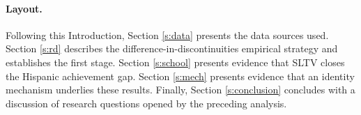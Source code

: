 \documentclass[11pt]{article}
\begin{document}








\paragraph{Layout.} Following this Introduction, Section \ref{s:data} presents the data sources used. Section \ref{s:rd} describes the difference-in-discontinuities empirical strategy and establishes the first stage. Section \ref{s:school} presents evidence that SLTV closes the Hispanic achievement gap. Section \ref{s:mech} presents evidence that an identity mechanism underlies these results. Finally, Section \ref{s:conclusion} concludes with a discussion of research questions opened by the preceding analysis.
\end{document}
